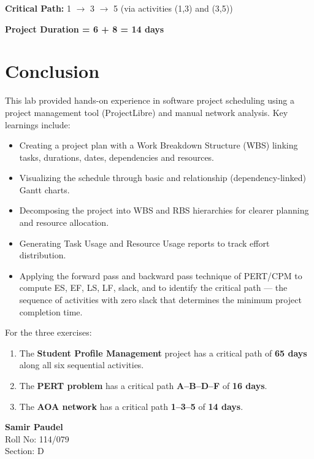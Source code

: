 \documentclass[10pt,a4paper]{article}
\begin{document}
\noindent\textbf{Critical Path:} 1 $\to$ 3 $\to$ 5 (via activities (1,3) and (3,5))

\noindent\textbf{Project Duration = 6 + 8 = 14 days}

\newpage
\section*{Conclusion}

This lab provided hands-on experience in software project scheduling using a project management tool (ProjectLibre) and manual network analysis. Key learnings include:

\begin{itemize}[nosep]
    \item Creating a project plan with a Work Breakdown Structure (WBS) linking tasks, durations, dates, dependencies and resources.
    \item Visualizing the schedule through basic and relationship (dependency-linked) Gantt charts.
    \item Decomposing the project into WBS and RBS hierarchies for clearer planning and resource allocation.
    \item Generating Task Usage and Resource Usage reports to track effort distribution.
    \item Applying the forward pass and backward pass technique of PERT/CPM to compute ES, EF, LS, LF, slack, and to identify the critical path --- the sequence of activities with zero slack that determines the minimum project completion time.
\end{itemize}

For the three exercises:
\begin{enumerate}[nosep]
    \item The \textbf{Student Profile Management} project has a critical path of \textbf{65 days} along all six sequential activities.
    \item The \textbf{PERT problem} has a critical path \textbf{A--B--D--F} of \textbf{16 days}.
    \item The \textbf{AOA network} has a critical path \textbf{1--3--5} of \textbf{14 days}.
\end{enumerate}

\vfill

\begin{flushright}
\textbf{Samir Paudel}\\
Roll No: 114/079\\
Section: D
\end{flushright}
\end{document}
